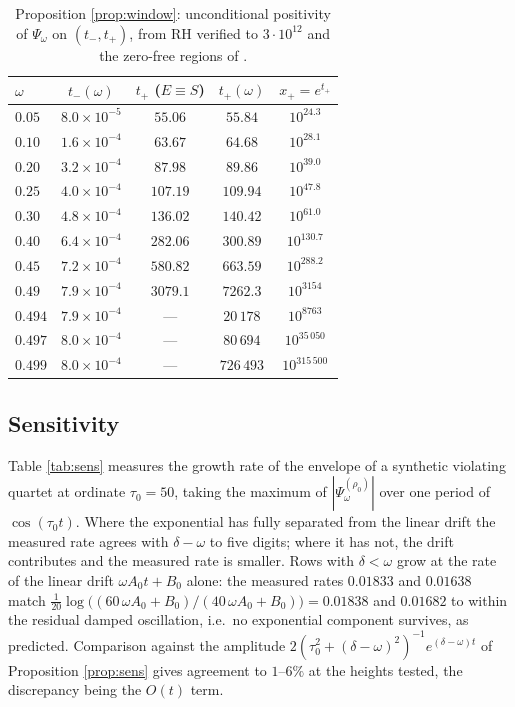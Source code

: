 \documentclass[11pt,reqno]{amsart}
\theoremstyle{plain}
\theoremstyle{definition}
\begin{document}
\begin{table}[htbp]
\centering
\begin{tabular}{@{}lcccc@{}}
\toprule
$\omega$ & $t_{-}(\omega)$ & $t_{+}$ ($E\equiv S$) & $t_{+}(\omega)$ & $x_{+}=e^{t_{+}}$\\
\midrule
$0.05$  & $8.0\times10^{-5}$ & $55.06$  & $55.84$   & $10^{24.3}$\\
$0.10$  & $1.6\times10^{-4}$ & $63.67$  & $64.68$   & $10^{28.1}$\\
$0.20$  & $3.2\times10^{-4}$ & $87.98$  & $89.86$   & $10^{39.0}$\\
$0.25$  & $4.0\times10^{-4}$ & $107.19$ & $109.94$  & $10^{47.8}$\\
$0.30$  & $4.8\times10^{-4}$ & $136.02$ & $140.42$  & $10^{61.0}$\\
$0.40$  & $6.4\times10^{-4}$ & $282.06$ & $300.89$  & $10^{130.7}$\\
$0.45$  & $7.2\times10^{-4}$ & $580.82$ & $663.59$  & $10^{288.2}$\\
$0.49$  & $7.9\times10^{-4}$ & $3079.1$ & $7262.3$  & $10^{3154}$\\
$0.494$ & $7.9\times10^{-4}$ & ---      & $20\,178$  & $10^{8763}$\\
$0.497$ & $8.0\times10^{-4}$ & ---      & $80\,694$  & $10^{35\,050}$\\
$0.499$ & $8.0\times10^{-4}$ & ---      & $726\,493$ & $10^{315\,500}$\\
\bottomrule
\end{tabular}
\vspace{2mm}
\caption{Proposition \ref{prop:window}: unconditional positivity of $\Psi_\omega$ on
$(t_{-},t_{+})$, from RH verified to $3\cdot10^{12}$ \cite{PlattTrudgian} and the zero-free
regions of \cite{MTY}.}
\label{tab:window}
\end{table}

\subsection{Sensitivity}
Table \ref{tab:sens} measures the growth rate of the envelope of a synthetic violating quartet at
ordinate $\tau_0=50$, taking the maximum of $|\Psi_\omega^{(\rho_0)}|$ over one period of
$\cos(\tau_0t)$. Where the exponential has fully separated from the linear drift the measured rate
agrees with $\delta-\omega$ to five digits; where it has not, the drift contributes and the measured
rate is smaller. Rows with $\delta<\omega$ grow at the rate of the linear drift
$\omega A_0t+B_0$ alone: the measured rates $0.01833$ and $0.01638$ match
$\tfrac1{20}\log\bigl((60\,\omega A_0+B_0)/(40\,\omega A_0+B_0)\bigr)=0.01838$ and $0.01682$ to
within the residual damped oscillation, i.e.\ no exponential component survives, as predicted. Comparison against the amplitude
$2(\tau_0^{2}+(\delta-\omega)^{2})^{-1}e^{(\delta-\omega)t}$ of Proposition \ref{prop:sens} gives
agreement to $1$--$6\%$ at the heights tested, the discrepancy being the $O(t)$ term.
\end{document}
